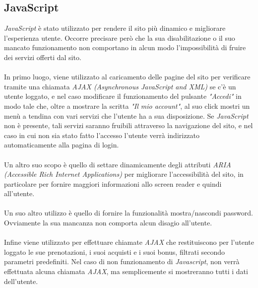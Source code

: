 \newpage
\subsection{JavaScript}
\textit{JavaScript} è stato utilizzato per rendere il sito più dinamico e migliorare l'esperienza utente.
Occorre precisare però che la sua disabilitazione o il suo mancato funzionamento non comportano in alcun
modo l'impossibilità di fruire dei servizi offerti dal sito.\\
\\
In primo luogo, viene utilizzato al caricamento delle pagine del sito per verificare tramite una
chiamata \textit{AJAX (Asynchronous JavaScript and XML)} se c'è un utente loggato, e nel caso modificare
il funzionamento del pulsante \textit{"Accedi"} in modo tale che, oltre a mostrare la scritta \textit{"Il
mio account"}, al suo click mostri un menù a tendina con vari servizi che l'utente ha a sua disposizione.
Se \textit{JavaScript} non è presente, tali servizi saranno fruibili attraverso la navigazione del sito,
e nel caso in cui non sia stato fatto l'accesso l'utente verrà indirizzato automaticamente alla pagina di
login.\\
\\
Un altro suo scopo è quello di settare dinamicamente degli attributi \textit{ARIA (Accessible Rich
Internet Applications)} per migliorare l'accessibilità del sito, in particolare per fornire maggiori
informazioni allo screen reader e quindi all'utente.\\
\\
Un suo altro utilizzo è quello di fornire la funzionalità mostra/nascondi password. Ovviamente la sua
mancanza non comporta alcun disagio all'utente.\\
\\
Infine viene utilizzato per effettuare chiamate \textit{AJAX} che restituiscono per l'utente loggato le
sue prenotazioni, i suoi acquisti e i suoi bonus, filtrati secondo parametri predefiniti. Nel caso di non
funzionamento di \textit{Javascript}, non verrà effettuata alcuna chiamata \textit{AJAX}, ma
semplicemente si mostreranno tutti i dati dell'utente.

\newpage
